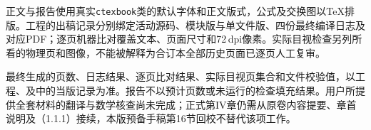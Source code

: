 正文与报告使用真实\texttt{ctexbook}类的默认字体和正文版式，公式及交换图以TeX排版。工程的出稿记录分别绑定活动源码、模块版与单文件版、四份最终编译日志及对应PDF；逐页机器比对覆盖文本、页面尺寸和72\,dpi像素。实际目视检查另列所看的物理页和图像，不能被解释为合订本全部历史页面已逐页人工复审。

最终生成的页数、日志结果、逐页比对结果、实际目视页集合和文件校验值，以工程、及中的当版记录为准。报告不以预计页数或未运行的检查填充结果。用户所提供全套材料的翻译与数学核查尚未完成；正式第IV章仍需从原卷内容提要、章首说明及（1.1.1）接续，本版预备手稿第16节回校不替代该项工作。
